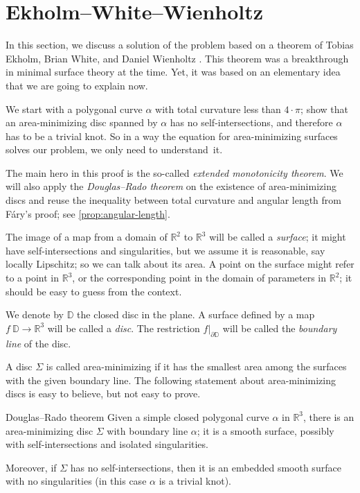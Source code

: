  \section{Ekholm--White--Wienholtz}

In this section, we discuss a solution of the problem based on a theorem of Tobias Ekholm, Brian White, and Daniel Wienholtz \cite{EWW_embed}.
This theorem was a breakthrough in minimal surface theory at the time.
Yet, it was based on an elementary idea that we are going to explain now.

We start with a polygonal curve $\alpha$ with total curvature less than $4\cdot\pi$;
show that an area-minimizing disc spanned by $\alpha$ has no self-intersections, and therefore $\alpha$ has to be a trivial knot.
So in a way the equation for area-minimizing surfaces solves our problem, we only need to understand~it.

The main hero in this proof is the so-called \emph{extended monotonicity theorem}.
We will also apply the \emph{Douglas--Rado theorem} on the existence of area-minimizing discs and reuse the inequality between total curvature and angular length from F\'ary's proof; see \ref{prop:angular-length}.

The image of a map from a domain of $\mathbb{R}^2$ to $\mathbb{R}^3$ will be called a \emph{surface};
it might have self-intersections and singularities, but we assume it is reasonable, say locally Lipschitz; so we can talk about its area.
A point on the surface might refer to a point in $\mathbb{R}^3$, or the corresponding point in the domain of parameters in $\mathbb{R}^2$;
it should be easy to guess from the context.

We denote by $\mathbb{D}$ the closed disc in the plane.
A surface defined by a map $f\:\mathbb{D}\to\mathbb{R}^3$ will be called a \emph{disc}.
The restriction $f|_{\partial \mathbb{D}}$ will be called the \emph{boundary line} of the disc.

A disc $\Sigma$ is called area-minimizing if it has the smallest area among the surfaces with the given boundary line.
The following statement about area-minimizing discs is easy to believe, but not easy to prove. %

\begin{thm}{Douglas--Rado theorem}\label{thm:min-exists}
Given a simple closed polygonal curve $\alpha$ in $\mathbb{R}^3$, there is an area-minimizing disc $\Sigma$ with boundary line $\alpha$; it is a smooth surface, possibly with self-intersections and isolated singularities.

Moreover, if $\Sigma$ has no self-intersections, then it is an embedded smooth surface with no singularities (in this case $\alpha$ is a trivial knot).
\end{thm}

